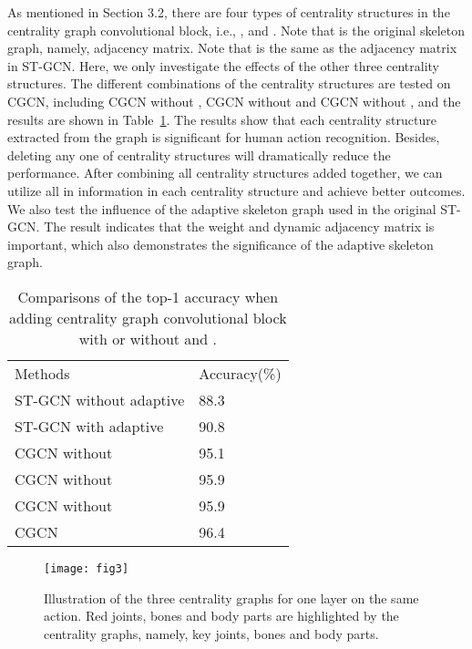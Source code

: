 \documentclass[runningheads]{llncs}
\begin{document}
As mentioned in Section 3.2, there are four types of centrality structures in the centrality graph convolutional block, i.e., , and . Note that  is the original skeleton graph, namely, adjacency matrix. Note that  is the same as the adjacency matrix in ST-GCN. Here, we only investigate the effects of the other three centrality structures. The different combinations of the centrality structures are tested on CGCN, including CGCN without , CGCN without  and CGCN without , and the results are shown in Table~\ref{table1}. The results show that each centrality structure extracted from the graph is significant for human action recognition. Besides, deleting any one of centrality structures will dramatically reduce the performance. After combining all centrality structures added together, we can utilize all in information in each centrality structure and achieve better outcomes. We also test the influence of the adaptive skeleton graph used in the original ST-GCN. The result indicates that the weight and dynamic adjacency matrix is important, which also demonstrates the significance of the adaptive skeleton graph.
\begin{table}[!tbp]\begin{center}
\caption{Comparisons of the top-1 accuracy when adding
centrality graph convolutional block with or without  and .}
\label{table1}
\begin{tabular}{ll}
\hline\noalign{\smallskip}
Methods & Accuracy(\%)\\
\noalign{\smallskip}
\hline
\noalign{\smallskip}
ST-GCN without adaptive & 88.3\\
ST-GCN with adaptive &  90.8\\
CGCN without &  95.1\\
CGCN without  & 95.9 \\
CGCN without  & 95.9\\
CGCN  &  96.4\\
\hline
\end{tabular}
\end{center}
\end{table}
\begin{figure}[!h]
\centering
\texttt{[image: fig3]}
\caption{Illustration of the three centrality graphs for one layer on the same action. Red joints, bones and body parts are highlighted by the centrality graphs, namely, key joints, bones and body parts.}
\label{fig3}
\end{figure}
\end{document}
